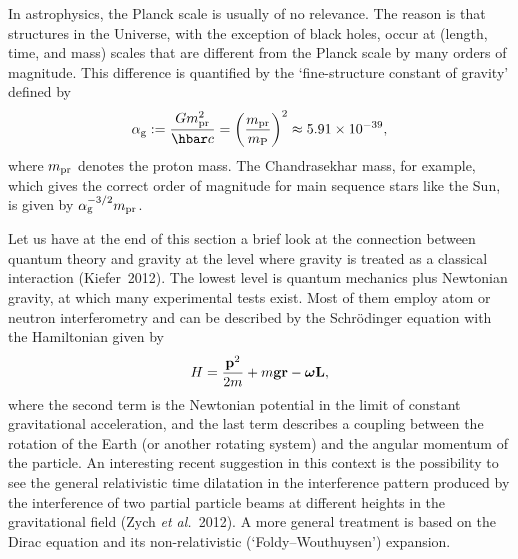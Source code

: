 \documentclass[12pt,a4paper]{article}
\newcommand{\be}{\begin{equation}}
\newcommand{\ee}{\end{equation}}
\newcommand{\lb}{\label}
\begin{document}
In astrophysics, the Planck scale is usually of no relevance. The
reason is that structures in the Universe, with the exception of black
holes, occur at (length, time, and mass) scales that are different
from the Planck scale by many orders of magnitude. 
This difference is quantified by the `fine-structure constant of
gravity' defined by
\be
\alpha_{\rm g}:= \frac{Gm_{\rm pr}^2}{\hbar c}=
\left(\frac{m_{\rm pr}}{m_{\rm P}}\right)^2 \approx 5.91\times 10^{-39} ,
\lb{alphag}
\ee
where $m_{\rm pr}$ denotes the proton mass. The Chandrasekhar mass,
for example, which gives the correct order of magnitude for main
sequence stars like the Sun, is given by $\alpha_{\rm g}^{-3/2}m_{\rm
  pr}$. 

Let us have at the end of this section a brief look at the connection
between quantum theory and gravity at the level where gravity is
treated as a classical interaction (Kiefer~2012). The lowest level is 
quantum mechanics plus Newtonian gravity, at which many experimental
tests exist. 
Most of them employ atom or neutron interferometry and
can be described by the Schr\"odinger equation with the
Hamiltonian given by
\be
H=\frac{{\mathbf p}^2}{2m} +m{\mathbf g}{\mathbf r}-
 \mbox{\boldmath$\omega$}{\mathbf L} ,
\lb{HCOW}
\ee
where the second term is the Newtonian potential in the limit of
constant gravitational acceleration, and the last term describes a
coupling between the rotation of the Earth (or another rotating
system) and the angular momentum of the particle. 
An interesting recent suggestion in this context is the possibility to
see the general relativistic time dilatation in the interference
pattern produced by the interference of two partial particle beams at
different heights in the gravitational field
(Zych {\em et al.}~2012). A more general treatment is based on the
Dirac equation and its non-relativistic (`Foldy--Wouthuysen') expansion.
\end{document}
